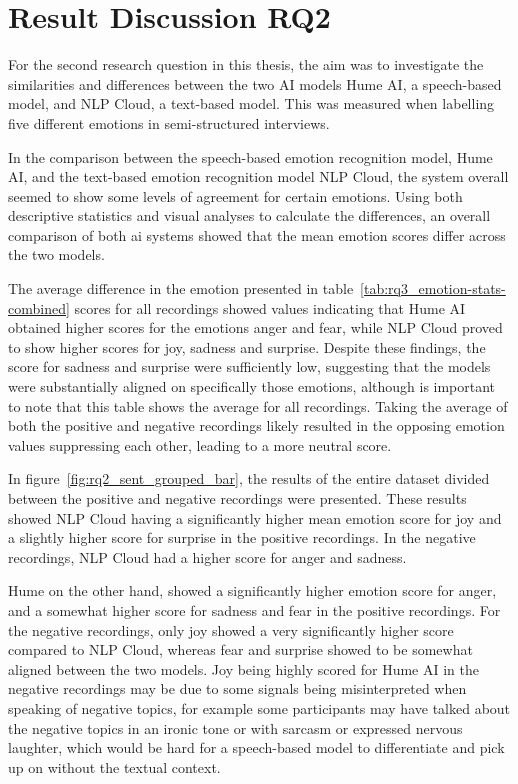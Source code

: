 
\section{Result Discussion RQ2}
For the second research question in this thesis, the aim was to investigate the similarities and differences between the two AI models Hume AI, a speech-based model, and NLP Cloud, a text-based model. This was measured when labelling five different emotions in semi-structured interviews.

\label{subsec:RQ2interpretation}
In the comparison between the speech-based emotion recognition model, Hume AI, and the text-based emotion recognition model NLP Cloud, the system overall seemed to show some levels of agreement for certain emotions. Using both descriptive statistics and visual analyses to calculate the differences, an overall comparison of both ai systems showed that the mean emotion scores differ across the two models.

The average difference in the emotion presented in table~\ref{tab:rq3_emotion-stats-combined} scores for all recordings showed values indicating that Hume AI obtained higher scores for the emotions anger and fear, while NLP Cloud proved to show higher scores for joy, sadness and surprise. Despite these findings, the score for sadness and surprise were sufficiently low, suggesting that the models were substantially aligned on specifically those emotions, although is important to note that this table shows the average for all recordings. Taking the average of both the positive and negative recordings likely resulted in the opposing emotion values suppressing each other, leading to a more neutral score.

In figure~\ref{fig:rq2_sent_grouped_bar}, the results of the entire dataset divided between the positive and negative recordings were presented. These results showed NLP Cloud having a significantly higher mean emotion score for joy and a slightly higher score for surprise in the positive recordings. In the negative recordings, NLP Cloud had a higher score for anger and sadness. 

Hume on the other hand, showed a significantly higher emotion score for anger, and a somewhat higher score for sadness and fear in the positive recordings. For the negative recordings, only joy showed a very significantly higher score compared to NLP Cloud, whereas fear and surprise showed to be somewhat aligned between the two models. Joy being highly scored for Hume AI in the negative recordings may be due to some signals being misinterpreted when speaking of negative topics, for example some participants may have talked about the negative topics in an ironic tone or with sarcasm or expressed nervous laughter, which would be hard for a speech-based model to differentiate and pick up on without the textual context.

